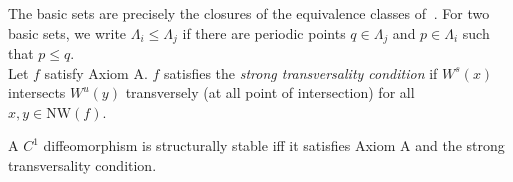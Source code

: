 The basic sets are precisely the closures of the equivalence classes of $~$. For two basic sets, we write $\Lambda_i \leq \Lambda_j$ if there are periodic points $q \in \Lambda_j$ and $p \in \Lambda_i$ such that $p \leq q$. \\
\indent Let $f$ satisfy Axiom A. $f$ satisfies the \textit{strong transversality condition} if $W^s(x)$ intersects $W^u(y)$ transversely (at all point of intersection) for all $x,y \in \mathrm{NW}(f)$. \\

\begin{thm}

A $C^1$ diffeomorphism is structurally stable iff it satisfies Axiom A and the strong transversality condition. 

\end{thm}






